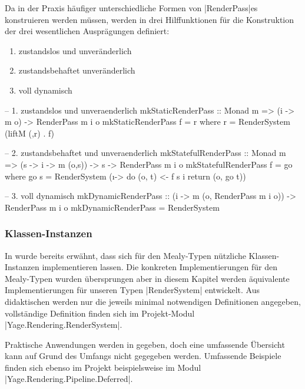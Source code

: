 Da in der Praxis häufiger unterschiedliche Formen von |RenderPass|es konstruieren werden müssen, werden in  drei Hilffunktionen für die Konstruktion der drei wesentlichen Ausprägungen definiert:

\begin{enumerate}
\item zustandslos und unveränderlich
\item zustandsbehaftet unveränderlich
\item voll dynamisch
\end{enumerate}

\begin{haskell}[label={lst:renderpass-ctr},caption={Konstruktoren für einen RenderPass}]
-- 1. zustandslos und unveraenderlich
mkStaticRenderPass :: Monad m => (i -> m o) -> RenderPass m i o
mkStaticRenderPass f = r where r = RenderSystem (liftM (,r) . f)

-- 2. zustandsbehaftet und unveraenderlich
mkStatefulRenderPass :: Monad m => (s -> i -> m (o,s)) -> s -> RenderPass m i o
mkStatefulRenderPass f = go where
  go s = RenderSystem (\i -> do
    (o, t) <- f s i
    return (o, go t))

-- 3. voll dynamisch
mkDynamicRenderPass :: (i -> m (o, RenderPass m i o)) -> RenderPass m i o
mkDynamicRenderPass = RenderSystem
\end{haskell}



\subsubsection{Klassen-Instanzen}
\label{sec:rendersystem-klassen-instanzen}

In  wurde bereits erwähnt, dass sich für den Mealy-Typen nützliche Klassen-Instanzen implementieren lassen. Die konkreten Implementierungen für den Mealy-Typen wurden übersprungen aber in diesem Kapitel werden äquivalente Implementierungen für unseren Typen |RenderSystem| entwickelt. Aus didaktischen werden nur die jeweils minimal notwendigen Definitionen angegeben, vollständige Definition finden sich im Projekt-Modul |Yage.Rendering.RenderSystem|.

Praktische Anwendungen werden in  gegeben, doch eine umfassende Übersicht kann auf Grund des Umfangs nicht gegegeben werden. Umfassende Beispiele finden sich ebenso im Projekt beispielsweise im Modul \linebreak|Yage.Rendering.Pipeline.Deferred|.


